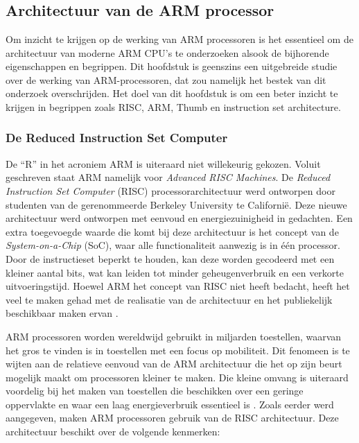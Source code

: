 \chapter{}
\label{ch:stand-van-zaken}



\section{Architectuur van de ARM processor}
Om inzicht te krijgen op de werking van ARM processoren is het essentieel om de architectuur van moderne ARM CPU’s te onderzoeken alsook de bijhorende eigenschappen en begrippen. Dit hoofdstuk is geenszins een uitgebreide studie over de werking van ARM-processoren, dat zou namelijk het bestek van dit onderzoek overschrijden. Het doel van dit hoofdstuk is om een beter inzicht te krijgen in begrippen zoals RISC, ARM, Thumb en instruction set architecture. 

\subsection{De Reduced Instruction Set Computer}
De “R” in het acroniem ARM is uiteraard niet willekeurig gekozen. Voluit geschreven staat ARM namelijk voor \textit{Advanced RISC Machines}. De \textit{Reduced Instruction Set Computer} (RISC) processorarchitectuur werd ontworpen door studenten van de gerenommeerde Berkeley University te Californië. Deze nieuwe architectuur werd ontworpen met eenvoud en energiezuinigheid in gedachten. Een extra toegevoegde waarde die komt bij deze architectuur is het concept van de \textit{System-on-a-Chip} (SoC), waar alle functionaliteit aanwezig is in één processor. Door de instructieset beperkt te houden, kan deze worden gecodeerd met een kleiner aantal bits, wat kan leiden tot minder geheugenverbruik en een verkorte uitvoeringstijd. Hoewel ARM het concept van RISC niet heeft bedacht, heeft het veel te maken gehad met de realisatie van de architectuur en het publiekelijk beschikbaar maken ervan \autocite{Fulton2020}. 

ARM processoren worden wereldwijd gebruikt in miljarden toestellen, waarvan het gros te vinden is in toestellen met een focus op mobiliteit. Dit fenomeen is te wijten aan de relatieve eenvoud van de ARM architectuur die het op zijn beurt mogelijk maakt om processoren kleiner te maken. Die kleine omvang is uiteraard voordelig bij het maken van toestellen die beschikken over een geringe oppervlakte en waar een laag energieverbruik essentieel is \autocite{Seal2000}. Zoals eerder werd aangegeven, maken ARM processoren gebruik van de RISC architectuur. Deze architectuur beschikt over de volgende kenmerken:

